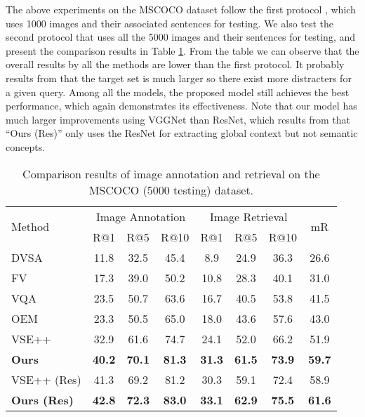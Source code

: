 \documentclass[10pt,twocolumn,letterpaper]{article}
\begin{document}
The above experiments on the MSCOCO dataset follow
the first protocol \cite{karpathy2014vsa},
which uses 1000 images and their associated sentences for testing.
We also test the second protocol that uses all the 5000 images and their sentences
for testing,
and present the comparison results in Table \ref{table:coco5k}.
From the table we can observe that
the overall results by all the methods are lower
than the first protocol.
It probably results from that the target set is much larger
so there exist more distracters for a given query.
Among all the models, the proposed model still achieves the best performance, which again
demonstrates its effectiveness.
Note that our model has much larger improvements using VGGNet than ResNet, which results from
that ``Ours (Res)'' only uses the ResNet for extracting global context
but not semantic concepts.




\begin{table}[t] \small
\addtolength{\tabcolsep}{-3pt}
\centering
\caption{Comparison results of image annotation and retrieval on the MSCOCO (5000 testing) dataset. }
\begin{tabular}{l|ccc|ccc|c}
\hline
\hline
\multirow{2}{0.7cm}{Method}     &  \multicolumn{3}{c|}{Image Annotation}  &  \multicolumn{3}{c|}{Image Retrieval} & \multirow{2}{0.5cm}{{mR}}  \\
\cline{2-7}
     & R$@$1 & R$@$5  & R$@$10  & R$@$1 & R$@$5  & R$@$10  &    \\
\hline

DVSA \cite{karpathy2014vsa}               &11.8 &32.5 &45.4  &8.9 &24.9 &36.3  &26.6 \\
FV\cite{klein2015associating}  &17.3 &39.0 &50.2  &10.8 &28.3 &40.1  &31.0\\
VQA \cite{lin2016leveraging}              &23.5 &50.7 &63.6   &16.7 &40.5 &53.8   & 41.5\\
OEM \cite{vendrov2015order}               &23.3 &50.5 &65.0 &18.0 &43.6   &57.6  &43.0\\
VSE++ \cite{faghri2017vse++}              &32.9 &61.6  &74.7   &24.1 &52.0 &66.2   & 51.9\\
\textbf{Ours}  &\bf{40.2} &\bf{70.1} &\bf{81.3}  &\bf{31.3} &\bf{61.5} &\bf{73.9}  & \bf{59.7}\\

\hline
VSE++ (Res) \cite{faghri2017vse++}      &41.3 &69.2  &81.2   &30.3 &59.1 &72.4  & 58.9\\
\textbf{Ours (Res)} &\bf{42.8} &\bf{72.3} &\bf{83.0} &\bf{33.1} &\bf{62.9} &\bf{75.5}  &\bf{61.6} \\

\hline
\hline
\end{tabular}
\label{table:coco5k}
\end{table}
\end{document}
